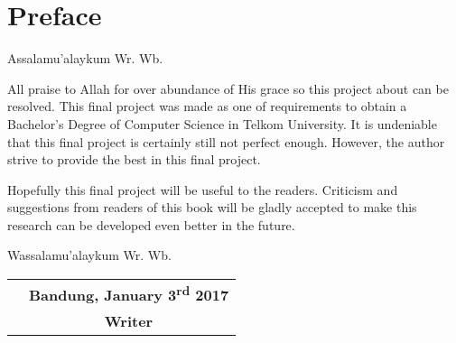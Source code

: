 \chapter*{Preface}

Assalamu'alaykum Wr. Wb.

\vspace{1cm}

All praise to Allah for over abundance of His grace so this project about \Title can be resolved. This final project was made as one of requirements to obtain a Bachelor's Degree of Computer Science in Telkom University. 
It is undeniable that this final project is certainly still not perfect enough. However, the author strive to provide the best in this final project.

Hopefully this final project will be useful to the readers. Criticism and suggestions from readers of this book will be gladly accepted to make this research can be developed even better in the future.

\vspace{1cm}
Wassalamu'alaykum Wr. Wb.

\vspace{1cm}
\begin{center}
\begin{tabular} {m{7cm} c}
	 & \textbf{Bandung, January 3\textsuperscript{rd} 2017} \\
	 & \textbf{Writer}
\end{tabular}
\end{center}